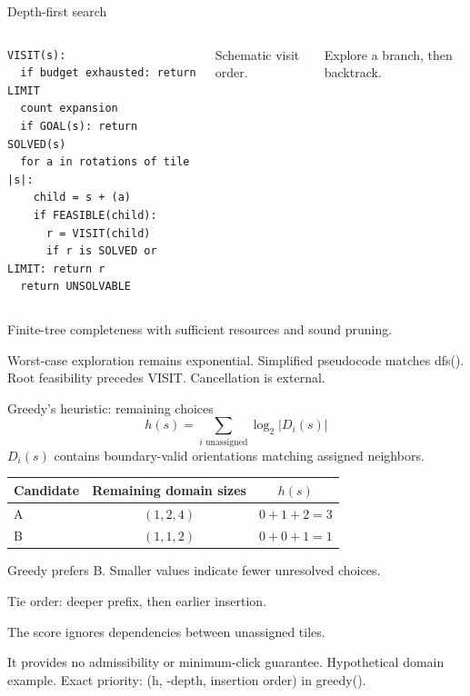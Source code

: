 \documentclass[aspectratio=169,11pt]{beamer}
\newcommand{\src}[1]{\vfill{\tiny\color{muted}#1}}
\begin{document}
\begin{frame}[fragile]{Depth-first search}
\begin{columns}[T,onlytextwidth]
\begin{lstlisting}
VISIT(s):
  if budget exhausted: return LIMIT
  count expansion
  if GOAL(s): return SOLVED(s)
  for a in rotations of tile |s|:
    child = s + (a)
    if FEASIBLE(child):
      r = VISIT(child)
      if r is SOLVED or LIMIT: return r
  return UNSOLVABLE
\end{lstlisting}
\par\vspace{3mm}\small Schematic visit order.\par
Explore a branch, then backtrack.
\end{columns}
\vspace{4mm}
\small Finite-tree completeness with sufficient resources and sound pruning.\par
Worst-case exploration remains exponential.
\src{Simplified pseudocode matches dfs(). Root feasibility precedes VISIT. Cancellation is external.}
\end{frame}

\begin{frame}{Greedy's heuristic: remaining choices}
\[
h(s)=\sum_{i\text{ unassigned}}\log_2 |D_i(s)|
\]
\small $D_i(s)$ contains boundary-valid orientations matching assigned neighbors.
\vspace{5mm}
\begin{center}
\begin{tabular}{@{}lcc@{}}
\toprule
Candidate & Remaining domain sizes & $h(s)$\\\midrule
A & $(1,2,4)$ & $0+1+2=3$\\
B & $(1,1,2)$ & $0+0+1=1$\\\bottomrule
\end{tabular}
\end{center}
\vspace{3mm}
Greedy prefers B. Smaller values indicate fewer unresolved choices.\par
\small Tie order: deeper prefix, then earlier insertion.\par\vspace{3mm}
The score ignores dependencies between unassigned tiles.\par
It provides no admissibility or minimum-click guarantee.
\src{Hypothetical domain example. Exact priority: (h, -depth, insertion order) in greedy().}
\end{frame}
\end{document}
